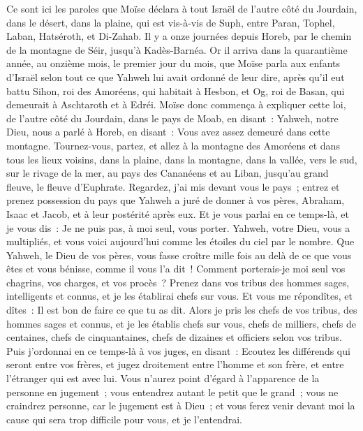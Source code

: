 \begin{multicols}{2}
\VerseOne{}Ce sont ici les paroles que Moïse déclara à tout Israël de l'autre côté du Jourdain, dans le désert, dans la plaine, qui est vis-à-vis de Suph, entre Paran, Tophel, Laban, Hatséroth, et Di-Zahab.
Il y a onze journées depuis Horeb, par le chemin de la montagne de Séir, jusqu'à Kadès-Barnéa.
Or il arriva dans la quarantième année, au onzième mois, le premier jour du mois, que Moïse parla aux enfants d'Israël selon tout ce que Yahweh lui avait ordonné de leur dire,
après qu'il eut battu Sihon, roi des Amoréens, qui habitait à Hesbon, et Og, roi de Basan, qui demeurait à Aschtaroth et à Edréi.
Moïse donc commença à expliquer cette loi, de l'autre côté du Jourdain, dans le pays de Moab, en disant~:
Yahweh, notre Dieu, nous a parlé à Horeb, en disant~: Vous avez assez demeuré dans cette montagne.
Tournez-vous, partez, et allez à la montagne des Amoréens et dans tous les lieux voisins, dans la plaine, dans la montagne, dans la vallée, vers le sud, sur le rivage de la mer, au pays des Cananéens et au Liban, jusqu'au grand fleuve, le fleuve d'Euphrate.
Regardez, j'ai mis devant vous le pays~; entrez et prenez possession du pays que Yahweh a juré de donner à vos pères, Abraham, Isaac et Jacob, et à leur postérité après eux.
Et je vous parlai en ce temps-là, et je vous dis~: Je ne puis pas, à moi seul, vous porter.
Yahweh, votre Dieu, vous a multipliés, et vous voici aujourd'hui comme les étoiles du ciel par le nombre.
Que Yahweh, le Dieu de vos pères, vous fasse croître mille fois au delà de ce que vous êtes et vous bénisse, comme il vous l'a dit~!
Comment porterais-je moi seul vos chagrins, vos charges, et vos procès~?
Prenez dans vos tribus des hommes sages, intelligents et connus, et je les établirai chefs sur vous.
Et vous me répondîtes, et dîtes~: Il est bon de faire ce que tu as dit.
Alors je pris les chefs de vos tribus, des hommes sages et connus, et je les établis chefs sur vous, chefs de milliers, chefs de centaines, chefs de cinquantaines, chefs de dizaines et officiers selon vos tribus. 
Puis j'ordonnai en ce temps-là à vos juges, en disant~: Ecoutez les différends qui seront entre vos frères, et jugez droitement entre l'homme et son frère, et entre l'étranger qui est avec lui.
Vous n'aurez point d'égard à l'apparence de la personne en jugement~; vous entendrez autant le petit que le grand~; vous ne craindrez personne, car le jugement est à Dieu~; et vous ferez venir devant moi la cause qui sera trop difficile pour vous, et je l'entendrai. 

\end{multicols}
